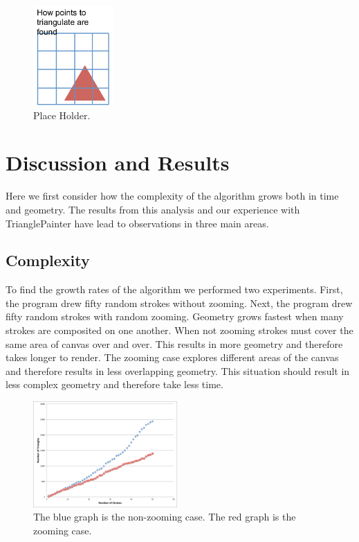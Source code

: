 \documentclass[conference]{acmsiggraph}
\begin{document}
\begin{figure}
    \centering
        \includegraphics[height=1.5in]{images/findingmodifiedpoints}
    \caption{Place Holder.}
\end{figure}


\section{Discussion and Results}
Here we first consider how the complexity of the algorithm grows both in time and geometry.
The results from this analysis and our experience with TrianglePainter have lead to observations in three main areas.

\subsection{Complexity}
To find the growth rates of the algorithm we performed two experiments. 
First, the program drew fifty random strokes without zooming.
Next, the program drew fifty random strokes with random zooming.
Geometry grows fastest when many strokes are composited on one another. When not zooming strokes
must cover the same area of canvas over and over. This
results in more geometry and therefore takes longer to render. The zooming case explores different
areas of the canvas and therefore results in less overlapping geometry. This situation should result
in less complex geometry and therefore take less time.

\begin{figure}
    \centering
        \includegraphics[width=0.49\textwidth]{graphs/numtriangles}
    \caption{The blue graph is the non-zooming case. The red graph is the zooming case.}
    \label{fig:numtriangles}
\end{figure}
\end{document}
